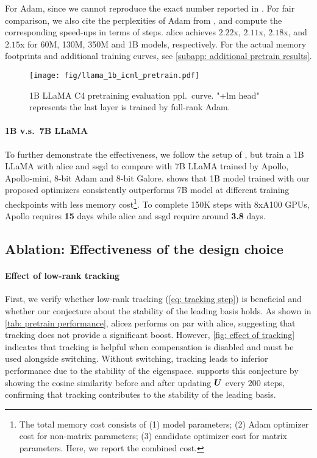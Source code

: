 For Adam, since we cannot reproduce the exact number reported in \citet{zhu2024apollo}. For fair comparison, we also cite the perplexities of Adam from \citet{zhu2024apollo}, and compute the corresponding speed-ups in terms of steps. \gls{alice} achieves $2.22$x, $2.11$x, $2.18$x, and $2.15$x for 60M, 130M, 350M and 1B models, respectively.  
For the actual memory footprints and additional training curves, see \cref{subapp: additional pretrain results}.
\begin{figure}
    \centering
    \texttt{[image: fig/llama\_1b\_icml\_pretrain.pdf]}
    \caption{1B LLaMA C4 pretraining evaluation ppl.~curve. "+lm head" represents the last layer is trained by full-rank Adam.}
    \label{fig:1b pretrain curve}
\end{figure}
\paragraph{1B v.s.~7B LLaMA}
To further demonstrate the effectiveness, we follow the setup of \citet{zhu2024apollo}, but train a 1B LLaMA with \gls{alice} and \gls{ssgd} to compare with 7B LLaMA trained by Apollo, Apollo-mini, 8-bit Adam and 8-bit Galore.  shows that 1B model trained with our proposed optimizers consistently outperforms 7B model at different training checkpoints with less memory cost\footnote{The total memory cost consists of (1) model parameters; (2) Adam optimizer cost for non-matrix parameters; (3) candidate optimizer cost for matrix parameters. Here, we report the combined cost.}. To complete 150K steps with 8xA100 GPUs, Apollo requires \textbf{15} days while \gls{alice} and \gls{ssgd} require around \textbf{3.8} days.

\subsection{Ablation: Effectiveness of the design choice}
\label{subsec: exp ablation study}

\paragraph{Effect of low-rank tracking}
First, we verify whether low-rank tracking (\cref{eq: tracking step}) is beneficial and whether our conjecture about the stability of the leading basis holds. As shown in \cref{tab: pretrain performance}, \gls{alicez} performs on par with \gls{alice}, suggesting that tracking does not provide a significant boost. However, \cref{fig: effect of tracking} indicates that tracking is helpful when compensation is disabled and must be used alongside switching. Without switching, tracking leads to inferior performance due to the stability of the eigenspace.  supports this conjecture by showing the cosine similarity before and after updating 
${\bm{U}}$ every $200$ steps, confirming that tracking contributes to the stability of the leading basis.


